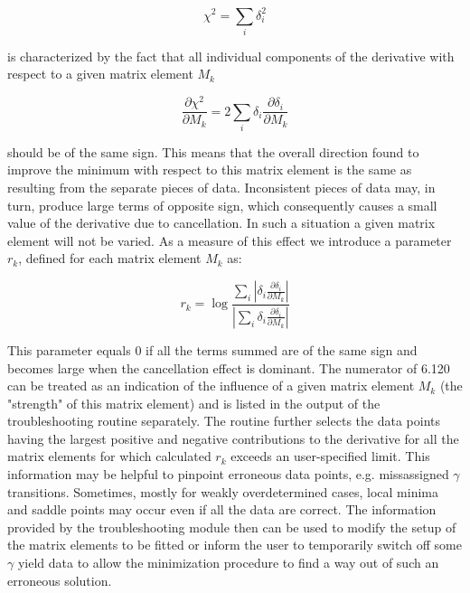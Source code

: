 \documentclass[10pt]{article}
\begin{document}
\begin{equation*}
\chi^{2}=\sum_{i} \delta_{i}^{2} \tag{6.122}
\end{equation*}


is characterized by the fact that all individual components of the derivative with respect to a given matrix element $M_{k}$


\begin{equation*}
\frac{\partial \chi^{2}}{\partial M_{k}}=2 \sum_{i} \delta_{i} \frac{\partial \delta_{i}}{\partial M_{k}} \tag{6.123}
\end{equation*}


should be of the same sign. This means that the overall direction found to improve the minimum with respect to this matrix element is the same as resulting from the separate pieces of data. Inconsistent pieces of data may, in turn, produce large terms of opposite sign, which consequently causes a small value of the derivative due to cancellation. In such a situation a given matrix element will not be varied. As a measure of this effect we introduce a parameter $r_{k}$, defined for each matrix element $M_{k}$ as:


\begin{equation*}
r_{k}=\log \frac{\sum_{i}\left|\delta_{i} \frac{\partial \delta_{i}}{\partial M_{k}}\right|}{\left|\sum_{i} \delta_{i} \frac{\partial \delta_{i}}{\partial M_{k}}\right|} \tag{6.124}
\end{equation*}


This parameter equals 0 if all the terms summed are of the same sign and becomes large when the cancellation effect is dominant. The numerator of 6.120 can be treated as an indication of the influence of a given matrix element $M_{k}$ (the "strength" of this matrix element) and is listed in the output of the troubleshooting routine separately. The routine further selects the data points having the largest positive and negative contributions to the derivative for all the matrix elements for which calculated $r_{k}$ exceeds an user-specified limit. This information may be helpful to pinpoint erroneous data points, e.g. missassigned $\gamma$\\
transitions. Sometimes, mostly for weakly overdetermined cases, local minima and saddle points may occur even if all the data are correct. The information provided by the troubleshooting module then can be used to modify the setup of the matrix elements to be fitted or inform the user to temporarily switch off some $\gamma$ yield data to allow the minimization procedure to find a way out of such an erroneous solution.
\end{document}
